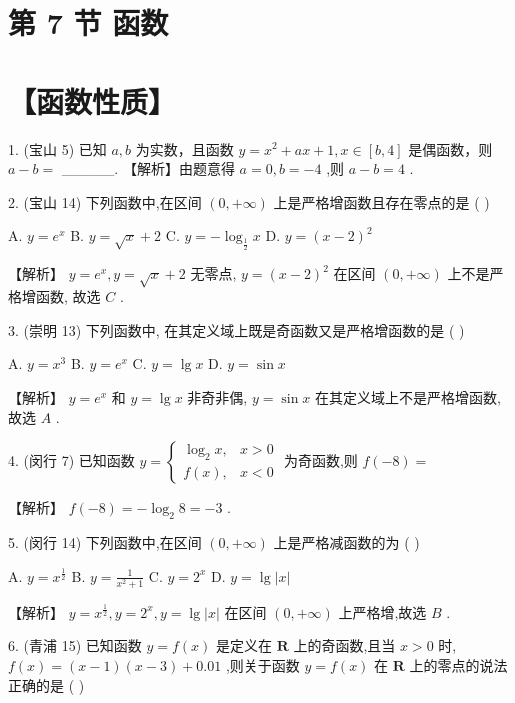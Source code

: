 \documentclass[10pt]{article}
\begin{document}
\section*{第 7 节 函数}

\section*{【函数性质】}

1. (宝山 5) 已知 \(a,b\) 为实数，且函数 \(y = {x}^{2} + {ax} + 1,x \in  \left\lbrack  {b,4}\right\rbrack\) 是偶函数，则 \(a - b =\) \_\_\_\_\_. 【解析】由题意得 \(a = 0,b =  - 4\) ,则 \(a - b = 4\) .

2. (宝山 14) 下列函数中,在区间 \(\left( {0, + \infty }\right)\) 上是严格增函数且存在零点的是 ( )

A. \(y = {e}^{x}\) B. \(y = \sqrt{x} + 2\) C. \(y =  - {\log }_{\frac{1}{2}}x\) D. \(y = {\left( x - 2\right) }^{2}\)

【解析】 \(y = {e}^{x},y = \sqrt{x} + 2\) 无零点, \(y = {\left( x - 2\right) }^{2}\) 在区间 \(\left( {0, + \infty }\right)\) 上不是严格增函数, 故选 \(C\) .

3. (崇明 13) 下列函数中, 在其定义域上既是奇函数又是严格增函数的是 ( )

A. \(y = {x}^{3}\) B. \(y = {e}^{x}\) C. \(y = \lg x\) D. \(y = \sin x\)

【解析】 \(y = {e}^{x}\) 和 \(y = \lg x\) 非奇非偶, \(y = \sin x\) 在其定义域上不是严格增函数,故选 \(A\) .

4. (闵行 7) 已知函数 \(y = \left\{  \begin{array}{ll} {\log }_{2}x, & x > 0 \\  f\left( x\right) , & x < 0 \end{array}\right.\) 为奇函数,则 \(f\left( {-8}\right)  =\)

【解析】 \(f\left( {-8}\right)  =  - {\log }_{2}8 =  - 3\) .

5. (闵行 14) 下列函数中,在区间 \(\left( {0, + \infty }\right)\) 上是严格减函数的为 ( )

A. \(y = {x}^{\frac{1}{2}}\) B. \(y = \frac{1}{{x}^{2} + 1}\) C. \(y = {2}^{x}\) D. \(y = \lg \left| x\right|\)

【解析】 \(y = {x}^{\frac{1}{2}},y = {2}^{x},y = \lg \left| x\right|\) 在区间 \(\left( {0, + \infty }\right)\) 上严格增,故选 \(B\) .

6. (青浦 15) 已知函数 \(y = f\left( x\right)\) 是定义在 \(\mathbf{R}\) 上的奇函数,且当 \(x > 0\) 时, \(f\left( x\right)  = \left( {x - 1}\right) \left( {x - 3}\right)  + {0.01}\) ,则关于函数 \(y = f\left( x\right)\) 在 \(\mathbf{R}\) 上的零点的说法正确的是 ( )
\end{document}
